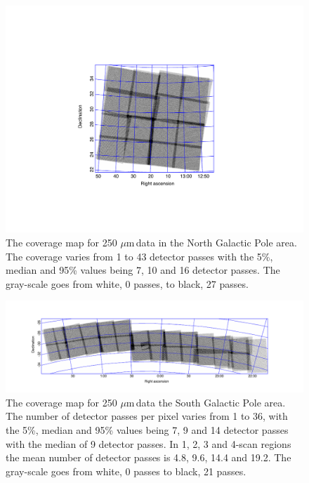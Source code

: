 \documentclass[useAMS,usenatbib]{mn2e}
\def\mic{ $\mu $m\,}
\begin{document}
\begin{figure} %
\includegraphics[scale=0.7]{ngpcoverage.pdf}
\caption{\protect\label{skymapn} The coverage map for 250\mic data
  in the North Galactic Pole area. The coverage varies from 1 to 43
  detector passes with the 5\%, median and 95\% values being 7, 10 and
  16 detector passes. The gray-scale goes from white, 0 passes, to
  black, 27 passes.}

\end{figure}

\begin{figure} %
\includegraphics[scale=1.]{sgpcoverage.pdf}
\caption{ \protect\label{skymaps} The coverage map for 250\mic data
  the South Galactic Pole area.  The number of detector passes per
  pixel varies from 1 to 36, with the 5\%, median and 95\% values
  being 7, 9 and 14 detector passes with the median of 9 detector
  passes. In 1, 2, 3 and 4-scan regions the mean number of detector
  passes is 4.8, 9.6, 14.4 and 19.2. The gray-scale goes from white, 0
  passes to black, 21 passes.  }

\end{figure}
\end{document}

